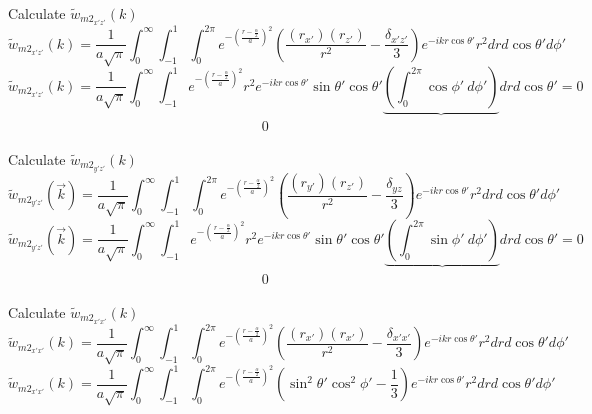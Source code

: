 \documentclass[double,12pt]{beavtex}
\begin{document}
Calculate $\widetilde{w}_{{m2}_{x'z'}}(k)$ 
\begin{equation}{\widetilde{w}_{{m2}_{x'z'}}(k)=\frac{1}{a\sqrt{\pi}}\int_{0}^{\infty}\int_{-1}^{1}\int_{0}^{2\pi}e^{-\left(\frac{r-\frac{\alpha}{2}}{a}\right)^2}\left(\frac{(r_{x'})(r_{z'})}{r^2}-\frac{\delta_{x'z'}}{3}\right)e^{-ikr\cos\theta'}r^2d{r}d{\cos\theta'}d{\phi'}}\end{equation}
\begin{equation}{\widetilde{w}_{{m2}_{x'z'}}(k)=\frac{1}{a\sqrt{\pi}}\int_{0}^{\infty}\int_{-1}^{1}e^{-\left(\frac{r-\frac{\alpha}{2}}{a}\right)^2}r^2e^{-ikr\cos\theta'}\sin\theta'\cos\theta'\underbrace{\left(\int_{0}^{2\pi}\cos\phi'~d{\phi'}\right)}d{r}d{\cos\theta'}=0}\end{equation}
$~~~~~~~~~~~~~~~~~~~~~~~~~~~~~~~~~~~~~~~~~~~~~~~~~~~~~~~~~~~~~~~~~~~~~~~~~~~~~~~~~~0$

Calculate $\widetilde{w}_{{m2}_{y'z'}}(k)$ 
\begin{equation}{\widetilde{w}_{{m2}_{y'z'}}(\vec{k})=\frac{1}{a\sqrt{\pi}}\int_{0}^{\infty}\int_{-1}^{1}\int_{0}^{2\pi}e^{-\left(\frac{r-\frac{\alpha}{2}}{a}\right)^2}\left(\frac{(r_{y'})(r_{z'})}{r^2}-\frac{\delta_{yz}}{3}\right)e^{-ikr\cos\theta'}r^2d{r}d{\cos\theta'}d{\phi'}}\end{equation}
\begin{equation}{\widetilde{w}_{{m2}_{y'z'}}(\vec{k})=\frac{1}{a\sqrt{\pi}}\int_{0}^{\infty}\int_{-1}^{1}e^{-\left(\frac{r-\frac{\alpha}{2}}{a}\right)^2}r^2e^{-ikr\cos\theta'}\sin\theta'\cos\theta'\underbrace{\left(\int_{0}^{2\pi}\sin\phi'~d{\phi'}\right)}d{r}d{\cos\theta'}=0}\end{equation}
$~~~~~~~~~~~~~~~~~~~~~~~~~~~~~~~~~~~~~~~~~~~~~~~~~~~~~~~~~~~~~~~~~~~~~~~~~~~~~~~~~~0$

Calculate $\widetilde{w}_{{m2}_{x'x'}}(k)$ 
\begin{equation}{\widetilde{w}_{{m2}_{x'x'}}(k)=\frac{1}{a\sqrt{\pi}}\int_{0}^{\infty}\int_{-1}^{1}\int_{0}^{2\pi}e^{-\left(\frac{r-\frac{\alpha}{2}}{a}\right)^2}\left(\frac{(r_{x'})(r_{x'})}{r^2}-\frac{\delta_{x'x'}}{3}\right)e^{-ikr\cos\theta'}r^2d{r}d{\cos\theta'}d{\phi'}}\end{equation}
\begin{equation}{\widetilde{w}_{{m2}_{x'x'}}(k)=\frac{1}{a\sqrt{\pi}}\int_{0}^{\infty}\int_{-1}^{1}\int_{0}^{2\pi}e^{-\left(\frac{r-\frac{\alpha}{2}}{a}\right)^2}\left(\sin^2\theta'\cos^2\phi'-\frac{1}{3}\right)e^{-ikr\cos\theta'}r^2d{r}d{\cos\theta'}d{\phi'}}\end{equation}
\end{document}
